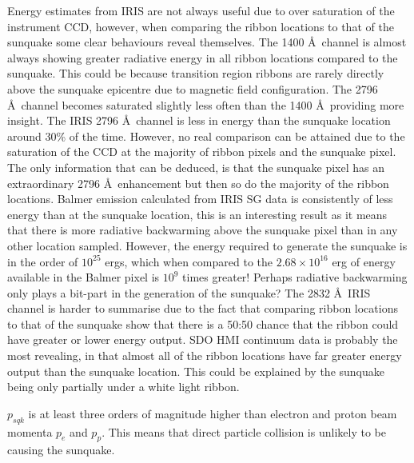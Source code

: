 Energy estimates from IRIS are not always useful due to over saturation of the instrument CCD, however, when comparing the ribbon locations to that of the sunquake some clear behaviours reveal themselves. The 1400 \AA\ channel is almost always showing greater radiative energy in all ribbon locations compared to the sunquake. This could be because transition region ribbons are rarely directly above the sunquake epicentre due to magnetic field configuration. The 2796 \AA\ channel becomes saturated slightly less often than the 1400 \AA\, providing more insight. The IRIS 2796 \AA\ channel is less in energy than the sunquake location around 30\% of the time. However, no real comparison can be attained due to the saturation of the CCD at the majority of ribbon pixels and the sunquake pixel. The only information that can be deduced, is that the sunquake pixel has an extraordinary 2796 \AA\ enhancement but then so do the majority of the ribbon locations. Balmer emission calculated from IRIS SG data is consistently of less energy than at the sunquake location, this is an interesting result as it means that there is more radiative backwarming above the sunquake pixel than in any other location sampled. However, the energy required to generate the sunquake is in the order of $10^25$ ergs, which when compared to the $2.68{\times}10^{16}$ erg of energy available in the Balmer pixel is $10^{9}$ times greater! Perhaps radiative backwarming only plays a bit-part in the generation of the sunquake?  
The 2832 \AA\ IRIS channel is harder to summarise due to the fact that comparing ribbon locations to that of the sunquake show that there is a 50:50 chance that the ribbon could have greater or lower energy output.
SDO HMI continuum data is probably the most revealing, in that almost all of the ribbon locations have far greater energy output than the sunquake location. This could be explained by the sunquake being only partially under a white light ribbon. 

$p_{sqk}$ is at least three orders of magnitude higher than electron and proton beam momenta $p_e$ and $p_p$. This means that direct particle collision is unlikely to be causing the sunquake. 
